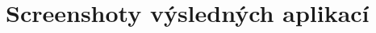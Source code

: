 \documentclass[a4paper, 11pt, twocolumn]{article}
\begin{document}
	\vspace*{\fill}
	\clearpage


	\section*{\large{Screenshoty výsledných aplikací}}
	\vspace*{-0.2cm}
	
\end{document}
